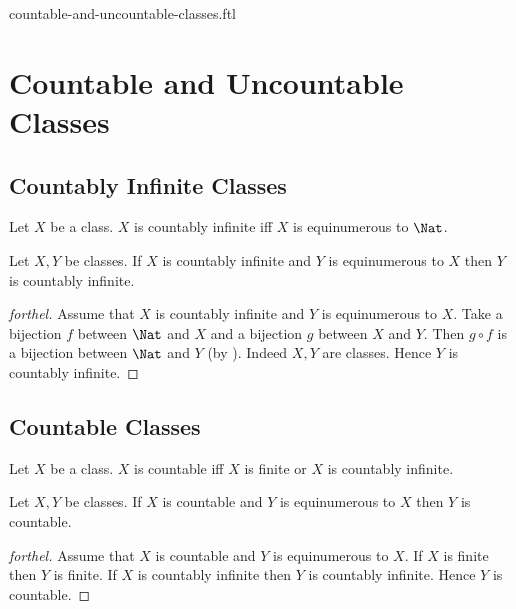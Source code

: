 \documentclass{naproche-library}
\begin{document}
\begin{smodule}{countable-and-uncountable-classes.ftl}

  \section*{Countable and Uncountable Classes}


  \subsection*{Countably Infinite Classes}

  \begin{definition}[forthel,id=FOUNDATIONS_14_6249029537103872,printid]
    Let $X$ be a class.
    $X$ is countably infinite iff $X$ is equinumerous to $\Nat$.
  \end{definition}

  \begin{proposition}[forthel,id=FOUNDATIONS_14_803449379749888,printid]
    Let $X, Y$ be classes.
    If $X$ is countably infinite and $Y$ is equinumerous to $X$ then $Y$ is countably infinite.
  \end{proposition}
  \begin{proof}[forthel]
    Assume that $X$ is countably infinite and $Y$ is equinumerous to $X$.
    Take a bijection $f$ between $\Nat$ and $X$ and a bijection $g$ between $X$ and $Y$.
    Then $g \circ f$ is a bijection between $\Nat$ and $Y$ (by ).
    Indeed $X, Y$ are classes.
    Hence $Y$ is countably infinite.
  \end{proof}


  \subsection*{Countable Classes}

  \begin{definition}[forthel,id=FOUNDATIONS_14_5412969443753984,printid]
    Let $X$ be a class.
    $X$ is countable iff $X$ is finite or $X$ is countably infinite.
  \end{definition}

  \begin{proposition}[forthel,id=FOUNDATIONS_14_4182588499427328,printid]
    Let $X, Y$ be classes.
    If $X$ is countable and $Y$ is equinumerous to $X$ then $Y$ is countable.
  \end{proposition}
  \begin{proof}[forthel]
    Assume that $X$ is countable and $Y$ is equinumerous to $X$.
    If $X$ is finite then $Y$ is finite.
    If $X$ is countably infinite then $Y$ is countably infinite.
    Hence $Y$ is countable.
  \end{proof}



\end{smodule}
\end{document}
